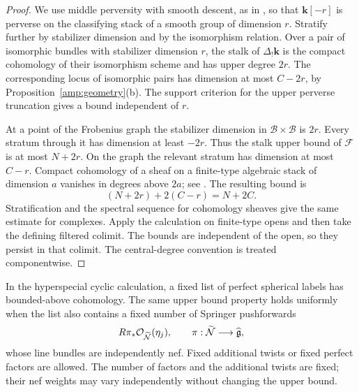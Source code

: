 \begin{proof}
We use middle perversity with smooth descent, as in
\cite[Lemma~4.1 and Theorems~4.2, 5.1]{LaszloOlssonPerverse}, so that
$\mathbf k[-r]$ is perverse on the classifying stack of a smooth
group of dimension $r$.  Stratify further by stabilizer dimension
and by the isomorphism relation.  Over a pair of isomorphic bundles
with stabilizer dimension $r$, the stalk of $\Delta_!\mathbf k$
is the compact cohomology of their isomorphism scheme and has upper
degree $2r$.  The corresponding locus of isomorphic pairs has
dimension at most $C-2r$, by Proposition~\ref{amp:geometry}(b).
The support criterion for the upper perverse truncation gives a
bound independent of $r$.

At a point of the Frobenius graph the stabilizer dimension in
$\mathcal B\times\mathcal B$ is $2r$.  Every stratum through it has
dimension at least $-2r$.  Thus the stalk upper bound of
$\mathcal F$ is at most $N+2r$.  On the graph the relevant stratum
has dimension at most $C-r$.  Compact cohomology of a sheaf on a
finite-type algebraic stack of dimension $a$ vanishes in degrees
above $2a$; see \cite[Theorem~1.4]{SunStacks}.
The resulting bound is
\[
 (N+2r)+2(C-r)=N+2C.
\]
Stratification and the spectral sequence for cohomology sheaves give
the same estimate for complexes.  Apply the calculation on
finite-type opens and then take the defining filtered colimit.
The bounds are independent of the open, so they persist in that
colimit.  The central-degree convention is treated componentwise.
\end{proof}

\begin{proposition}
\label{amp:tests}
In the hyperspecial cyclic calculation, a fixed list of perfect
spherical labels has bounded-above cohomology.  The same upper bound
property holds uniformly when the list also contains a fixed number
of Springer pushforwards
\[
 R\pi_*\mathcal O_{\widetilde{\mathcal N}}(\eta_j),
 \qquad
 \pi:\widetilde{\mathcal N}\longrightarrow\widehat{\mathfrak g},
\]
whose line bundles are independently nef.  Fixed additional twists
or fixed perfect factors are allowed.  The number of factors and
the additional twists are fixed; their nef weights may vary
independently without changing the upper bound.
\end{proposition}

